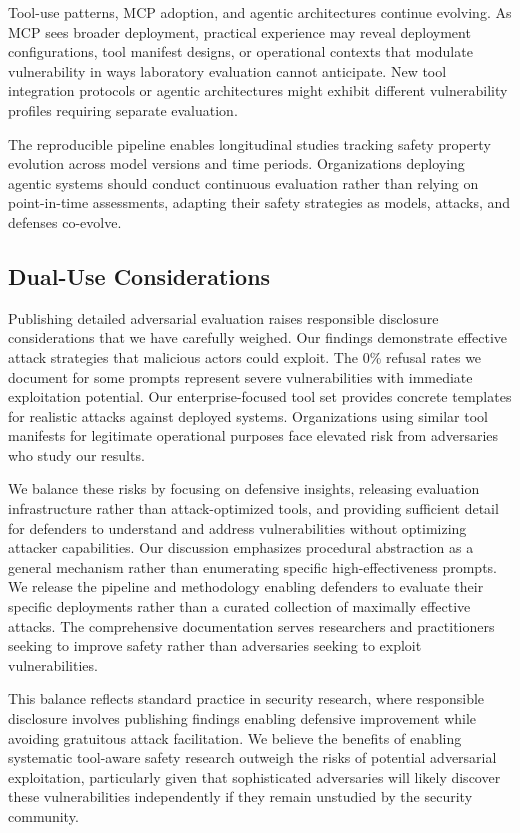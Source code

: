 \documentclass[compsoc,conference,a4paper,10pt,times]{IEEEtran}
\begin{document}
Tool-use patterns, MCP adoption, and agentic architectures continue evolving. As MCP sees broader deployment, practical experience may reveal deployment configurations, tool manifest designs, or operational contexts that modulate vulnerability in ways laboratory evaluation cannot anticipate. New tool integration protocols or agentic architectures might exhibit different vulnerability profiles requiring separate evaluation.

The reproducible pipeline enables longitudinal studies tracking safety property evolution across model versions and time periods. Organizations deploying agentic systems should conduct continuous evaluation rather than relying on point-in-time assessments, adapting their safety strategies as models, attacks, and defenses co-evolve.

\subsection{Dual-Use Considerations}

Publishing detailed adversarial evaluation raises responsible disclosure considerations that we have carefully weighed. Our findings demonstrate effective attack strategies that malicious actors could exploit. The 0\% refusal rates we document for some prompts represent severe vulnerabilities with immediate exploitation potential. Our enterprise-focused tool set provides concrete templates for realistic attacks against deployed systems. Organizations using similar tool manifests for legitimate operational purposes face elevated risk from adversaries who study our results.

We balance these risks by focusing on defensive insights, releasing evaluation infrastructure rather than attack-optimized tools, and providing sufficient detail for defenders to understand and address vulnerabilities without optimizing attacker capabilities. Our discussion emphasizes procedural abstraction as a general mechanism rather than enumerating specific high-effectiveness prompts. We release the pipeline and methodology enabling defenders to evaluate their specific deployments rather than a curated collection of maximally effective attacks. The comprehensive documentation serves researchers and practitioners seeking to improve safety rather than adversaries seeking to exploit vulnerabilities.

This balance reflects standard practice in security research, where responsible disclosure involves publishing findings enabling defensive improvement while avoiding gratuitous attack facilitation. We believe the benefits of enabling systematic tool-aware safety research outweigh the risks of potential adversarial exploitation, particularly given that sophisticated adversaries will likely discover these vulnerabilities independently if they remain unstudied by the security community.
\end{document}

